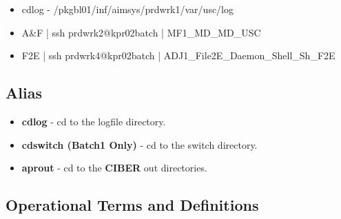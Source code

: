\documentclass[12pt,twoside]{article}
\begin{document}
\begin{itemize}
\item cdlog - \//pkgbl01\//inf\//aimsys\//prdwrk1\//var\//usc\//log
\item A\&F | ssh prdwrk2@kpr02batch | MF1\_MD\_MD\_USC
\item F2E | ssh prdwrk4@kpr02batch | ADJ1\_File2E\_Daemon\_Shell\_Sh\_F2E
\end{itemize}
\subsection{Alias}
\label{sec-3-11}

\begin{itemize}
\item \textbf{cdlog} - cd to the logfile directory.
\item \textbf{cdswitch (Batch1 Only)} - cd to the switch directory.
\item \textbf{aprout} - cd to the \textbf{CIBER} out directories.
\end{itemize}
\subsection{Operational Terms and Definitions}
\label{sec-3-12}
\end{document}
